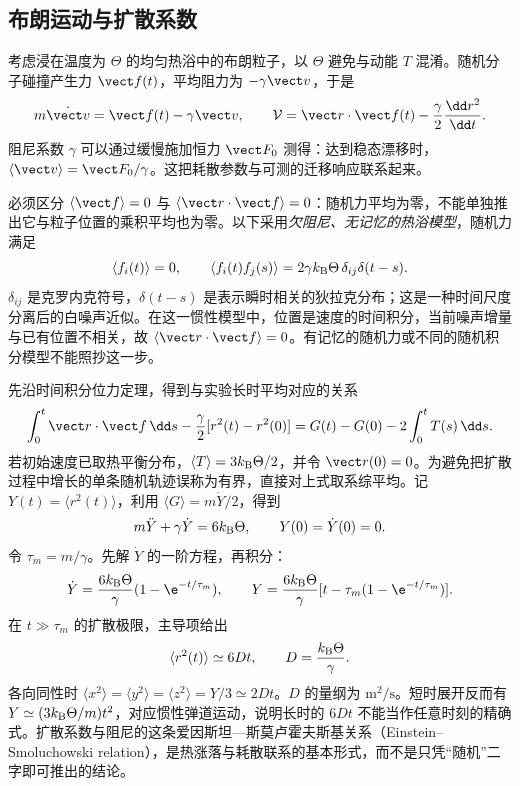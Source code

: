 \subsection{布朗运动与扩散系数}
\label{r2ch02:sec:brownian}

考虑浸在温度为 $\Theta$ 的均匀热浴中的布朗粒子，以 $\Theta$ 避免与动能 $T$ 混淆。随机分子碰撞产生力 $\vect f(t)$，平均阻力为 $-\gamma\vect v$，于是
\[
 m\dot{\vect v}=\vect f(t)-\gamma\vect v,\qquad
 \mathcal V=\vect r\cdot\vect f(t)-\frac\gamma2\frac{\dd r^2}{\dd t}.
\]
阻尼系数 $\gamma$ 可以通过缓慢施加恒力 $\vect F_0$ 测得：达到稳态漂移时，$\langle\vect v\rangle=\vect F_0/\gamma$。这把耗散参数与可测的迁移响应联系起来。

必须区分 $\langle\vect f\rangle=0$ 与 $\langle\vect r\cdot\vect f\rangle=0$：随机力平均为零，不能单独推出它与粒子位置的乘积平均也为零。以下采用\emph{欠阻尼、无记忆的热浴模型}，随机力满足
\[
 \langle f_i(t)\rangle=0,\qquad
 \langle f_i(t)f_j(s)\rangle=2\gamma k_{\rm B}\Theta\,
 \delta_{ij}\delta(t-s).
\]
$\delta_{ij}$ 是克罗内克符号，$\delta(t-s)$ 是表示瞬时相关的狄拉克分布；这是一种时间尺度分离后的白噪声近似。在这一惯性模型中，位置是速度的时间积分，当前噪声增量与已有位置不相关，故 $\langle\vect r\cdot\vect f\rangle=0$。有记忆的随机力或不同的随机积分模型不能照抄这一步。

先沿时间积分位力定理，得到与实验长时平均对应的关系
\[
 \int_0^t\vect r\cdot\vect f\,\dd s
 -\frac\gamma2[r^2(t)-r^2(0)]
 =G(t)-G(0)-2\int_0^t T(s)\,\dd s.
\]
若初始速度已取热平衡分布，$\langle T\rangle=3k_{\rm B}\Theta/2$，并令 $\vect r(0)=0$。为避免把扩散过程中增长的单条随机轨迹误称为有界，直接对上式取系综平均。记 $Y(t)=\langle r^2(t)\rangle$，利用 $\langle G\rangle=m\dot Y/2$，得到
\[
 m\ddot Y+\gamma\dot Y=6k_{\rm B}\Theta,
 \qquad Y(0)=\dot Y(0)=0.
\]
令 $\tau_m=m/\gamma$。先解 $\dot Y$ 的一阶方程，再积分：
\[
 \dot Y=\frac{6k_{\rm B}\Theta}{\gamma}(1-\e^{-t/\tau_m}),\qquad
 Y=\frac{6k_{\rm B}\Theta}{\gamma}
       [t-\tau_m(1-\e^{-t/\tau_m})].
\]
在 $t\gg\tau_m$ 的扩散极限，主导项给出
\begin{equation}
 \langle r^2(t)\rangle\simeq6Dt,\qquad
 D=\frac{k_{\rm B}\Theta}{\gamma}.
 \label{r2ch02:eq:023}
\end{equation}
各向同性时 $\langle x^2\rangle=\langle y^2\rangle=\langle z^2\rangle=Y/3\simeq2Dt$。$D$ 的量纲为 $\mathrm{m^2/s}$。短时展开反而有 $Y\simeq(3k_{\rm B}\Theta/m)t^2$，对应惯性弹道运动，说明长时的 $6Dt$ 不能当作任意时刻的精确式。扩散系数与阻尼的这条爱因斯坦—斯莫卢霍夫斯基关系（Einstein–Smoluchowski relation），是热涨落与耗散联系的基本形式，而不是只凭“随机”二字即可推出的结论。

